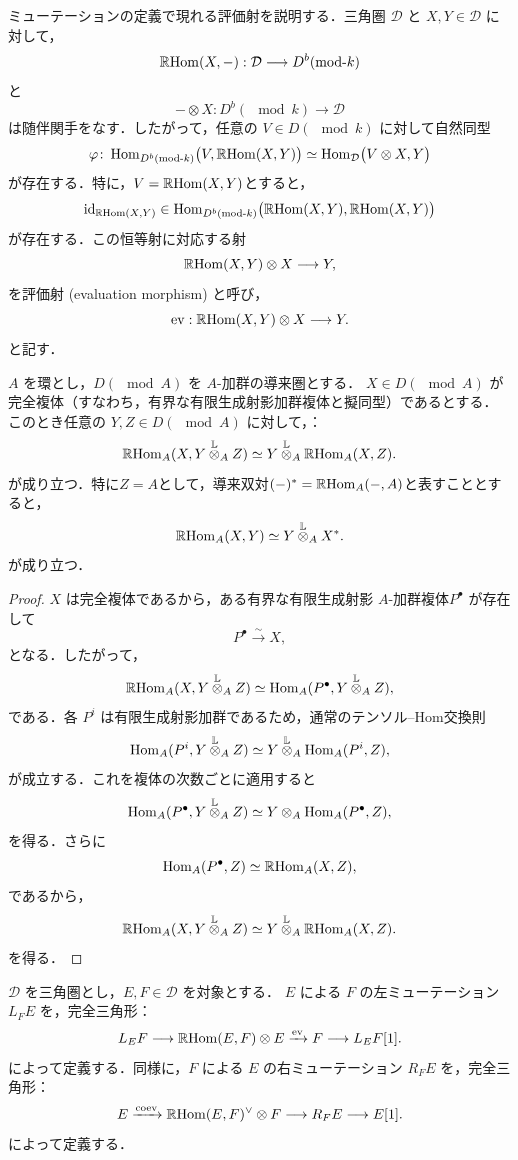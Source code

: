 ミューテーションの定義で現れる評価射を説明する．三角圏 $\mathcal D$ と $X,Y\in\mathcal D$ に対して，
\[
\RHom(X,-)
:
\mathcal D
\longrightarrow
D^b(\mod k)
\]
と
\[
-\otimes X
:
D^b(\mod k)
\longrightarrow
\mathcal D
\]
は随伴関手をなす．したがって，任意の $V\in D(\mod k)$ に対して自然同型
\[
\varphi\colon\Hom_{D^b(\mod k)}
\bigl(
V,\RHom(X,Y)
\bigr)
\simeq
\Hom_{\mathcal D}
\bigl(
V\otimes X,Y
\bigr)
\]
が存在する．特に，$V=\operatorname{\mathbb{R}\mathrm{Hom}}(X,Y)$とすると，
\[
\mathrm{id}_{\RHom(X,Y)}
\in
\Hom_{D^b(\mod k)}
\bigl(
\RHom(X,Y),
\RHom(X,Y)
\bigr)
\]
が存在する．この恒等射に対応する射
\[
\operatorname{\mathbb{R}\mathrm{Hom}}(X,Y)\otimes X
\longrightarrow
Y,
\]
を評価射 (evaluation morphism) と呼び，
\[
\mathrm{ev}
:
\operatorname{\mathbb{R}\mathrm{Hom}}(X,Y)\otimes X
\longrightarrow
Y.
\]
と記す．

\begin{lemm}
$A$ を環とし，$D(\mod A)$ を $A$-加群の導来圏とする．
$X \in D(\mod A)$ が完全複体（すなわち，有界な有限生成射影加群複体と擬同型）であるとする．
このとき任意の $Y,Z \in D(\mod A)$ に対して，：
\[
\operatorname{\mathbb{R}\mathrm{Hom}}_A(X,Y \overset{\mathbb{L}}{\otimes}_A Z)\simeq Y\overset{\mathbb{L}}{\otimes}_A \operatorname{\mathbb{R}\mathrm{Hom}}_A(X,Z).
\]
が成り立つ．特に$Z=A$として，導来双対$(-)^* = \operatorname{\mathbb{R}\mathrm{Hom}}_A(-, A)$と表すこととすると，
\[
\operatorname{\mathbb{R}\mathrm{Hom}}_A(X,Y)\simeq Y\overset{\mathbb{L}}{\otimes}_A X^* .
\]
が成り立つ．
\end{lemm}
\begin{proof}
$X$ は完全複体であるから，ある有界な有限生成射影 $A$-加群複体$P^\bullet$ が存在して
\[
P^\bullet \xrightarrow{\sim} X,
\]
となる．したがって，
\[
	\operatorname{\mathbb{R}\mathrm{Hom}}_A(X, Y \overset{\mathbb{L}}{\otimes}_A Z) \simeq \operatorname{\mathrm{Hom}}_A(P^\bullet, Y \overset{\mathbb{L}}{\otimes}_A Z),
\]
である．各 $P^i$ は有限生成射影加群であるため，通常のテンソル--Hom交換則
\[
\operatorname{\mathrm{Hom}}_A(P^i,Y \overset{\mathbb{L}}{\otimes}_A Z)\simeq Y \overset{\mathbb{L}}{\otimes}_A \operatorname{\mathrm{Hom}}_A(P^i,Z),
\]
が成立する．これを複体の次数ごとに適用すると
\[
	\operatorname{\mathrm{Hom}}_A(P^\bullet,Y\overset{\mathbb{L}}{\otimes}_A Z)\simeq Y\otimes_A\operatorname{\mathrm{Hom}}_A(P^\bullet,Z),
\]
を得る．さらに
\[
	\operatorname{\mathrm{Hom}}_A(P^\bullet,Z)\simeq \operatorname{\mathbb{R}\mathrm{Hom}}_A(X,Z),
\]
であるから，
\[
\operatorname{\mathbb{R}\mathrm{Hom}}_A(X,Y \overset{\mathbb{L}}{\otimes}_A Z)\simeq Y\overset{\mathbb{L}}{\otimes}_A \operatorname{\mathbb{R}\mathrm{Hom}}_A(X,Z).
\]
を得る．
\end{proof}

\begin{defn}
$\mathcal D$ を三角圏とし，$E,F\in\mathcal D$ を対象とする． $E$ による $F$ の左ミューテーション $L_FE$ を，完全三角形：
\[ L_E F \longrightarrow \operatorname{\mathbb{R}\mathrm{Hom}}(E,F)\otimes E \xrightarrow{\mathrm{ev}} F\longrightarrow  L_E F[1].\]
によって定義する．同様に，$F$ による $E$ の右ミューテーション $R_FE$ を，完全三角形：
\[ E \xrightarrow{\mathrm{coev}} \operatorname{\mathbb{R}\mathrm{Hom}}(E,F)^\vee\otimes F \longrightarrow R_FE \longrightarrow E[1].\]
によって定義する．
\end{defn}

